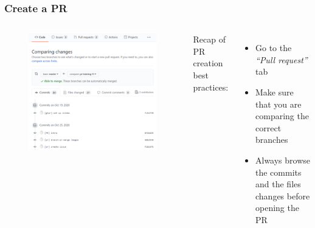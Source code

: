 \documentclass[aspectratio=169]{beamer} %
\begin{document}
\begin{frame}
	\frametitle{Create a PR}
	\begin{columns}[c]
		
		\vspace{-.5cm}
		\begin{figure}
			\centering
			\includegraphics[width=\textwidth]{./img/create-pr-0.png}
		\end{figure}
		
		Recap of PR creation best practices:
		\vspace{.5cm}
		\begin{itemize}
			\setlength\itemsep{.5em}
			\item Go to the \textit{``Pull request''} tab
			\item Make sure that you are comparing the correct branches
			\item Always browse the commits and the files changes before opening the PR
		\end{itemize}
		
	\end{columns}	
\end{frame}
\end{document}
